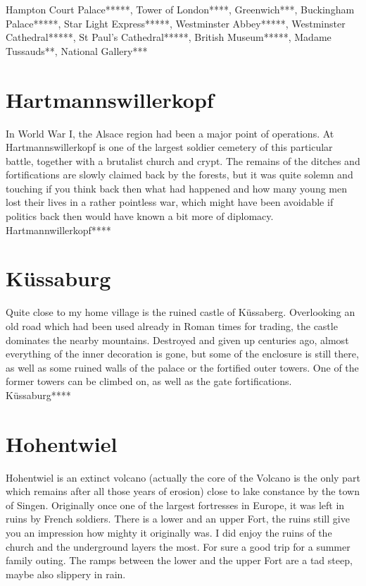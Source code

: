 Hampton Court Palace*****, Tower of London****, Greenwich***, Buckingham Palace*****, Star Light Express*****, Westminster Abbey*****, Westminster Cathedral*****, St Paul's Cathedral*****, British Museum*****, Madame Tussauds**, National Gallery***

\section{Hartmannswillerkopf}
\label{1996:Hartmannswillerkopf}

In World War I, the Alsace region had been a major point of operations. At Hartmannswillerkopf is one of the largest soldier cemetery of this particular battle, together with a brutalist church and crypt. The remains of the ditches and fortifications are slowly claimed back by the forests, but it was quite solemn and touching if you think back then what had happened and how many young men lost their lives in a rather pointless war, which might have been avoidable if politics back then would have known a bit more of diplomacy.\\

Hartmannwillerkopf****

\section{K\"ussaburg}
\label{1996:Kuessaburg}

Quite close to my home village is the ruined castle of K\"ussaberg. Overlooking an old road which had been used already in Roman times for trading, the castle dominates the nearby mountains. Destroyed and given up centuries ago, almost everything of the inner decoration is gone, but some of the enclosure is still there, as well as some ruined walls of the palace or the fortified outer towers. One of the former towers can be climbed on, as well as the gate fortifications.\\

K\"ussaburg****

\section{Hohentwiel}
\label{1996:Hohentwiel}

Hohentwiel is an extinct volcano (actually the core of the Volcano is the only part which remains after all those years of erosion) close to lake constance by the town of Singen. Originally once one of the largest fortresses in Europe, it was left in ruins by French soldiers. There is a lower and an upper Fort, the ruins still give you an impression how mighty it originally was. I did enjoy the ruins of the church and the underground layers the most. For sure a good trip for a summer family outing. The ramps between the lower and the upper Fort are a tad steep, maybe also slippery in rain.\\

